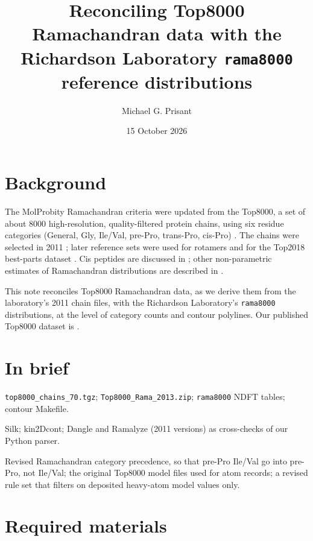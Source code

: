 \documentclass[11pt]{article}
\title{Reconciling Top8000 Ramachandran data with the Richardson Laboratory \texttt{rama8000} reference distributions}
\author{Michael G. Prisant}
\date{15 October 2026}
\newcommand{\file}[1]{\texttt{#1}}
\begin{document}
\maketitle

\section*{Background}

The MolProbity Ramachandran criteria \cite{Ramachandran1963,Lovell2003,Chen2010} were updated
from the Top8000, a set of about 8000 high-resolution, quality-filtered protein chains, using six
residue categories (General, Gly, Ile/Val, pre-Pro, trans-Pro, cis-Pro)
\cite{Read2011,Richardson2013,Williams2018}. The chains were selected in 2011
\cite{Keedy2011Origins,Top8000Page}; later reference sets were used for rotamers \cite{Lovell2000,Hintze2016}
and for the Top2018 best-parts dataset \cite{Williams2022,Top2018Zenodo}. Cis peptides are discussed in
\cite{Richardson2025}; other non-parametric estimates of Ramachandran distributions are
described in \cite{Ting2010,Shapovalov2013}.

This note reconciles Top8000 Ramachandran data, as we derive them from the laboratory's 2011 chain
files, with the Richardson Laboratory's \file{rama8000} distributions, at the level of category
counts and contour polylines. Our published Top8000 dataset is \cite{Top8000Zenodo}.

\section*{In brief}

\begin{description}[leftmargin=1.5em]
  \item[A.1 Data.] \file{top8000\_chains\_70.tgz}; \file{Top8000\_Rama\_2013.zip}; \file{rama8000}
    NDFT tables; contour Makefile.
  \item[A.2 Programs.] Silk; kin2Dcont; Dangle and Ramalyze (2011 versions) as cross-checks of
    our Python parser.
  \item[B. Implementation.] Revised Ramachandran category precedence, so that pre-Pro Ile/Val go
    into pre-Pro, not Ile/Val; the original Top8000 model files used for atom records; a revised
    rule set that filters on deposited heavy-atom model values only.
\end{description}

\section{Required materials}
\end{document}
